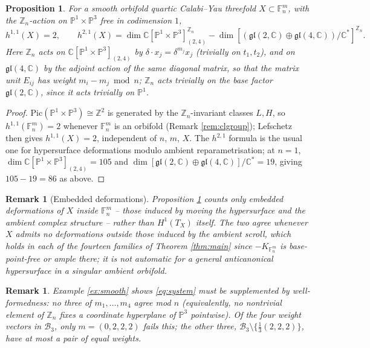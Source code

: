 \documentclass[11pt]{article}
\newtheorem{proposition}[theorem]{Proposition}
\newtheorem{remark}[theorem]{Remark}
\newcommand{\PP}{\mathbb{P}}
\newcommand{\ZZ}{\mathbb{Z}}
\newcommand{\CC}{\mathbb{C}}
\newcommand{\F}{\mathbb{F}}
\begin{document}
	\begin{proposition}\label{prop:hodge}
		For a smooth orbifold quartic Calabi--Yau threefold $X\subset\mathbb{F}^m_n$, with the $\ZZ_n$-action on $\PP^1\times\PP^3$ free in codimension $1$,
		\[
		h^{1,1}(X)=2,\qquad
		h^{2,1}(X)=\dim\CC[\PP^1\times\PP^3]^{\ZZ_n}_{(2,4)}
		-\dim[(\mathfrak{gl}(2,\CC)\oplus\mathfrak{gl}(4,\CC))/\CC^*]^{\ZZ_n}.
		\]
		Here $\ZZ_n$ acts on $\CC[\PP^1\times\PP^3]_{(2,4)}$ by $\delta\cdot x_j=\delta^{m_j}x_j$ (trivially on $t_1,t_2$), and on $\mathfrak{gl}(4,\CC)$ by the adjoint action of the same diagonal matrix, so that the matrix unit $E_{ij}$ has weight $m_i-m_j\bmod n$; $\ZZ_n$ acts trivially on the base factor $\mathfrak{gl}(2,\CC)$, since it acts trivially on $\PP^1$.
	\end{proposition}
	
	\begin{proof}
		$\mathrm{Pic}(\PP^1\times\PP^3)\cong\ZZ^2$ is generated by the $\ZZ_n$-invariant classes $L,H$, so $h^{1,1}(\F^m_n)=2$ whenever $\F^m_n$ is an orbifold (Remark \ref{rem:clgroup}); Lefschetz then gives $h^{1,1}(X)=2$, independent of $n$, $m$, $X$. The $h^{2,1}$ formula is the usual one for hypersurface deformations modulo ambient reparametrisation; at $n=1$, $\dim\CC[\PP^1\times\PP^3]_{(2,4)}=105$ and $\dim[\mathfrak{gl}(2,\CC)\oplus\mathfrak{gl}(4,\CC)]/\CC^*=19$, giving $105-19=86$ as above.
	\end{proof}
	
	\begin{remark}[Embedded deformations]\label{rem:embedded}
		Proposition \ref{prop:hodge} counts only \emph{embedded} deformations of $X$ inside $\F^m_n$ -- those induced by moving the hypersurface and the ambient complex structure -- rather than $H^1(T_X)$ itself. The two agree whenever $X$ admits no deformations outside those induced by the ambient scroll, which holds in each of the fourteen families of Theorem \ref{thm:main} since $-K_{\F^m_n}$ is base-point-free or ample there; it is not automatic for a general anticanonical hypersurface in a singular ambient orbifold.
	\end{remark}
	
	\begin{remark}\label{rem:wellformed}
		Example \ref{ex:smooth} shows \eqref{eq:system} must be supplemented by \emph{well-formedness}: no three of $m_1,\dots,m_4$ agree mod $n$ (equivalently, no nontrivial element of $\ZZ_n$ fixes a coordinate hyperplane of $\PP^3$ pointwise). Of the four weight vectors in $\mathcal B_3$, only $m=(0,2,2,2)$ fails this; the other three, $\mathcal B_3\setminus\{\frac13(2,2,2)\}$, have at most a pair of equal weights.
	\end{remark}
	
\end{document}
